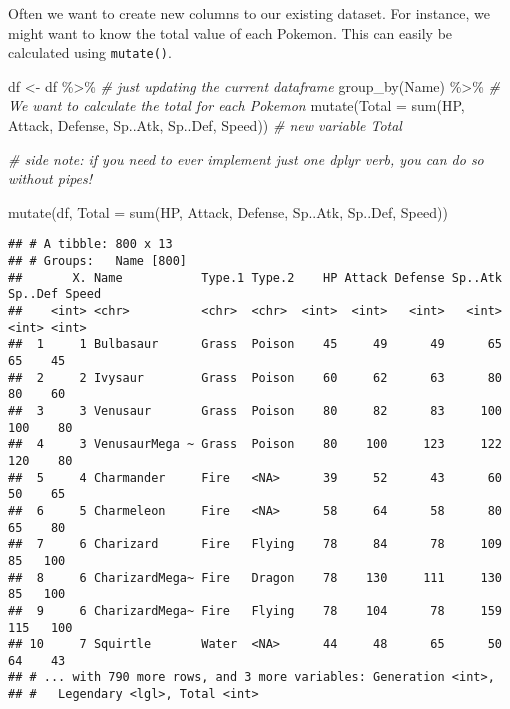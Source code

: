 \documentclass[
]{article}
\newenvironment{Shaded}{\begin{snugshade}}{\end{snugshade}}
\newcommand{\AttributeTok}[1]{\textcolor[rgb]{0.77,0.63,0.00}{#1}}
\newcommand{\CommentTok}[1]{\textcolor[rgb]{0.56,0.35,0.01}{\textit{#1}}}
\newcommand{\FunctionTok}[1]{\textcolor[rgb]{0.00,0.00,0.00}{#1}}
\newcommand{\NormalTok}[1]{#1}
\newcommand{\OtherTok}[1]{\textcolor[rgb]{0.56,0.35,0.01}{#1}}
\newcommand{\SpecialCharTok}[1]{\textcolor[rgb]{0.00,0.00,0.00}{#1}}
\begin{document}
Often we want to create new columns to our existing dataset. For
instance, we might want to know the total value of each Pokemon. This
can easily be calculated using \texttt{mutate()}.

\begin{Shaded}
\begin{Highlighting}[]
\NormalTok{df }\OtherTok{\textless{}{-}}\NormalTok{ df }\SpecialCharTok{\%\textgreater{}\%}                               \CommentTok{\# just updating the current dataframe}
      \FunctionTok{group\_by}\NormalTok{(Name) }\SpecialCharTok{\%\textgreater{}\%}                   \CommentTok{\# We want to calculate the total for each Pokemon}
      \FunctionTok{mutate}\NormalTok{(}\AttributeTok{Total =} \FunctionTok{sum}\NormalTok{(HP, Attack, Defense, Sp..Atk, Sp..Def, Speed)) }\CommentTok{\# new variable Total}

\CommentTok{\# side note: if you need to ever implement just one dplyr verb, you can do so without pipes!}

\FunctionTok{mutate}\NormalTok{(df, }\AttributeTok{Total =} \FunctionTok{sum}\NormalTok{(HP, Attack, Defense, Sp..Atk, Sp..Def, Speed))}
\end{Highlighting}
\end{Shaded}

\begin{verbatim}
## # A tibble: 800 x 13
## # Groups:   Name [800]
##       X. Name           Type.1 Type.2    HP Attack Defense Sp..Atk Sp..Def Speed
##    <int> <chr>          <chr>  <chr>  <int>  <int>   <int>   <int>   <int> <int>
##  1     1 Bulbasaur      Grass  Poison    45     49      49      65      65    45
##  2     2 Ivysaur        Grass  Poison    60     62      63      80      80    60
##  3     3 Venusaur       Grass  Poison    80     82      83     100     100    80
##  4     3 VenusaurMega ~ Grass  Poison    80    100     123     122     120    80
##  5     4 Charmander     Fire   <NA>      39     52      43      60      50    65
##  6     5 Charmeleon     Fire   <NA>      58     64      58      80      65    80
##  7     6 Charizard      Fire   Flying    78     84      78     109      85   100
##  8     6 CharizardMega~ Fire   Dragon    78    130     111     130      85   100
##  9     6 CharizardMega~ Fire   Flying    78    104      78     159     115   100
## 10     7 Squirtle       Water  <NA>      44     48      65      50      64    43
## # ... with 790 more rows, and 3 more variables: Generation <int>,
## #   Legendary <lgl>, Total <int>
\end{verbatim}
\end{document}
